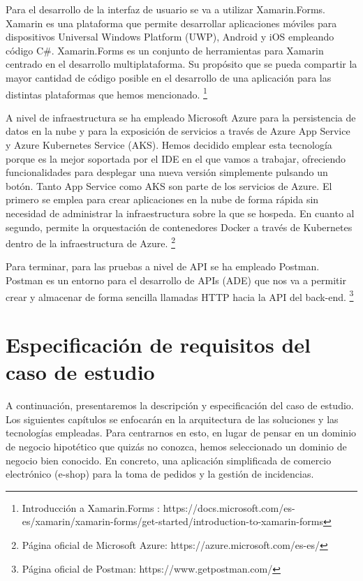 \documentclass[11pt,spanish,listoffigures]{tfgetsinf}
\begin{document}
Para el desarrollo de la interfaz de usuario se va a utilizar Xamarin.Forms. Xamarin es una plataforma que permite desarrollar aplicaciones móviles para dispositivos Universal Windows Platform (UWP), Android y iOS empleando código C\#. Xamarin.Forms es un conjunto de herramientas para Xamarin centrado en el desarrollo multiplataforma. Su propósito que se pueda compartir la mayor cantidad de código posible en el desarrollo de una aplicación para las distintas plataformas que hemos mencionado. \footnote{ Introducción a Xamarin.Forms
: https://docs.microsoft.com/es-es/xamarin/xamarin-forms/get-started/introduction-to-xamarin-forms}

A nivel de infraestructura se ha empleado Microsoft Azure para la persistencia de datos en la nube y para la exposición de servicios a través de Azure App Service y Azure Kubernetes Service (AKS). Hemos decidido emplear esta tecnología porque es la mejor soportada por el IDE en el que vamos a trabajar, ofreciendo funcionalidades para desplegar una nueva versión simplemente pulsando un botón. Tanto App Service como AKS son parte de los servicios de Azure. El primero se emplea para crear aplicaciones en la nube de forma rápida sin necesidad de administrar la infraestructura sobre la que se hospeda. En cuanto al segundo, permite la orquestación de contenedores Docker a través de Kubernetes dentro de la infraestructura de Azure. \footnote{ Página oficial de Microsoft Azure: https://azure.microsoft.com/es-es/}

Para terminar, para las pruebas a nivel de API se ha empleado Postman. Postman es un entorno para el desarrollo de APIs (ADE) que nos va a permitir crear y almacenar de forma sencilla llamadas HTTP hacia la API del back-end. \footnote{ Página oficial de Postman: https://www.getpostman.com/}


\chapter{Especificación de requisitos del caso de estudio}

A continuación, presentaremos la descripción y especificación del caso de estudio. Los siguientes capítulos se enfocarán en la arquitectura de las soluciones y las tecnologías empleadas. Para centrarnos en esto, en lugar de pensar en un dominio de negocio hipotético que quizás no conozca, hemos seleccionado un dominio de negocio bien conocido. En concreto, una aplicación simplificada de comercio electrónico (e-shop) para la toma de pedidos y la gestión de incidencias.
\end{document}
